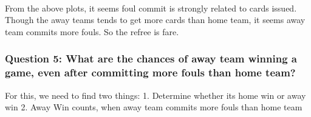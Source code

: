 \documentclass[11pt]{article}
\begin{document}
    \begin{center}
    \end{center}
    { \hspace*{\fill} \\}
    
    From the above plots, it seems foul commit is strongly related to cards
issued. Though the away teams tends to get more cards than home team, it
seems away team commits more fouls. So the refree is fare.

    \hypertarget{question-5-what-are-the-chances-of-away-team-winning-a-game-even-after-committing-more-fouls-than-home-team}{%
\subsubsection{Question 5: What are the chances of away team winning a
game, even after committing more fouls than home
team?}\label{question-5-what-are-the-chances-of-away-team-winning-a-game-even-after-committing-more-fouls-than-home-team}}

    For this, we need to find two things: 1. Determine whether its home win
or away win 2. Away Win counts, when away team commits more fouls than
home team
\end{document}
